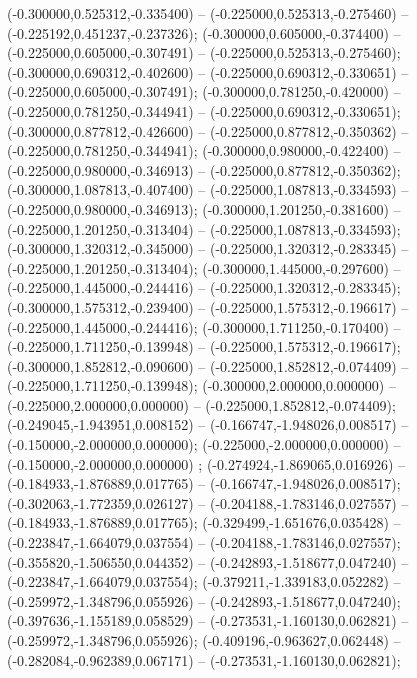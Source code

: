  (-0.300000,0.525312,-0.335400) -- (-0.225000,0.525313,-0.275460) -- (-0.225192,0.451237,-0.237326);
 (-0.300000,0.605000,-0.374400) -- (-0.225000,0.605000,-0.307491) -- (-0.225000,0.525313,-0.275460);
 (-0.300000,0.690312,-0.402600) -- (-0.225000,0.690312,-0.330651) -- (-0.225000,0.605000,-0.307491);
 (-0.300000,0.781250,-0.420000) -- (-0.225000,0.781250,-0.344941) -- (-0.225000,0.690312,-0.330651);
 (-0.300000,0.877812,-0.426600) -- (-0.225000,0.877812,-0.350362) -- (-0.225000,0.781250,-0.344941);
 (-0.300000,0.980000,-0.422400) -- (-0.225000,0.980000,-0.346913) -- (-0.225000,0.877812,-0.350362);
 (-0.300000,1.087813,-0.407400) -- (-0.225000,1.087813,-0.334593) -- (-0.225000,0.980000,-0.346913);
 (-0.300000,1.201250,-0.381600) -- (-0.225000,1.201250,-0.313404) -- (-0.225000,1.087813,-0.334593);
 (-0.300000,1.320312,-0.345000) -- (-0.225000,1.320312,-0.283345) -- (-0.225000,1.201250,-0.313404);
 (-0.300000,1.445000,-0.297600) -- (-0.225000,1.445000,-0.244416) -- (-0.225000,1.320312,-0.283345);
 (-0.300000,1.575312,-0.239400) -- (-0.225000,1.575312,-0.196617) -- (-0.225000,1.445000,-0.244416);
 (-0.300000,1.711250,-0.170400) -- (-0.225000,1.711250,-0.139948) -- (-0.225000,1.575312,-0.196617);
 (-0.300000,1.852812,-0.090600) -- (-0.225000,1.852812,-0.074409) -- (-0.225000,1.711250,-0.139948);
 (-0.300000,2.000000,0.000000) -- (-0.225000,2.000000,0.000000) -- (-0.225000,1.852812,-0.074409);
 (-0.249045,-1.943951,0.008152) -- (-0.166747,-1.948026,0.008517) -- (-0.150000,-2.000000,0.000000);
 (-0.225000,-2.000000,0.000000) -- (-0.150000,-2.000000,0.000000) ;
 (-0.274924,-1.869065,0.016926) -- (-0.184933,-1.876889,0.017765) -- (-0.166747,-1.948026,0.008517);
 (-0.302063,-1.772359,0.026127) -- (-0.204188,-1.783146,0.027557) -- (-0.184933,-1.876889,0.017765);
 (-0.329499,-1.651676,0.035428) -- (-0.223847,-1.664079,0.037554) -- (-0.204188,-1.783146,0.027557);
 (-0.355820,-1.506550,0.044352) -- (-0.242893,-1.518677,0.047240) -- (-0.223847,-1.664079,0.037554);
 (-0.379211,-1.339183,0.052282) -- (-0.259972,-1.348796,0.055926) -- (-0.242893,-1.518677,0.047240);
 (-0.397636,-1.155189,0.058529) -- (-0.273531,-1.160130,0.062821) -- (-0.259972,-1.348796,0.055926);
 (-0.409196,-0.963627,0.062448) -- (-0.282084,-0.962389,0.067171) -- (-0.273531,-1.160130,0.062821);
